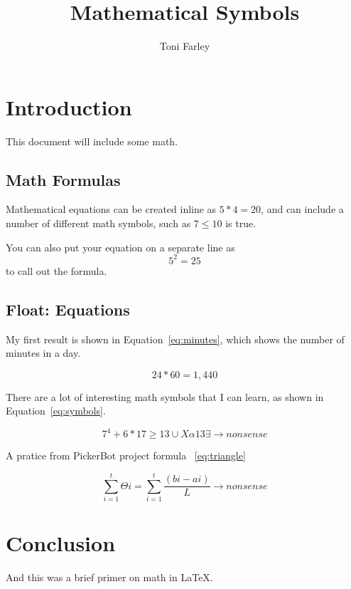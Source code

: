\documentclass{article}
\title{Mathematical Symbols}
\author{Toni Farley}
\date{}
\begin{document}
\maketitle

\section{Introduction}

This document will include some math.

\subsection{Math Formulas}

Mathematical equations can be created inline as $5*4=20$, and can include a number of different math symbols, such as $7 \leq 10$ is true.

You can also put your equation on a separate line as \[5^2 = 25\] to call out the formula.

\subsection{Float: Equations}

My first result is shown in Equation~\ref{eq:minutes}, which shows the number of minutes in a day.

\begin{equation}
24*60 = 1,440
\label{eq:minutes}
\end{equation}

There are a lot of interesting math symbols that I can learn, as shown in Equation~\ref{eq:symbols}.

\begin{equation}
7^4+6*17 \geq 13 \cup X \alpha 13 \exists \rightarrow nonsense
\label{eq:symbols}
\end{equation}

A pratice from PickerBot project formula ~\ref{eq:triangle}

\begin{equation}
    \sum_{i=1}^{t}\Theta i = \sum_{i=1}^{t} \frac{(bi-ai)}{L} \rightarrow nonsense
    \label{eq:triangle}
    \end{equation}
\section{Conclusion}

And this was a brief primer on math in \LaTeX.
\end{document}
